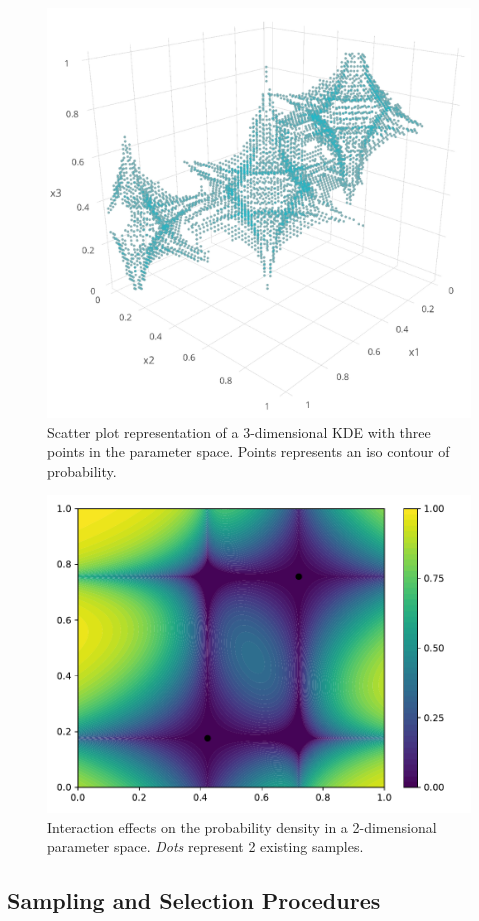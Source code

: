 \begin{figure}[!h]
\centering
\includegraphics[width=0.7\linewidth,keepaspectratio]{fig/contributions/doe/3d_star.png}
\caption{Scatter plot representation of a 3-dimensional KDE with three points in the parameter space. Points represents an iso contour of probability.}
\label{fig:3d_kde}
\end{figure}


\begin{figure}[!h]
\centering
\includegraphics[width=0.8\linewidth,keepaspectratio]{fig/contributions/doe/kde_inter.pdf}
\caption{Interaction effects on the probability density in a 2-dimensional parameter space. \emph{Dots} represent 2 existing samples.}
\label{fig:inter_kde}
\end{figure}


\subsection{Sampling and Selection Procedures}\label{sec:sample}

